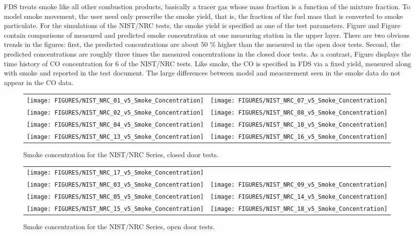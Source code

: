 FDS treats smoke like all other combustion products, basically a tracer gas whose mass fraction is a function of the mixture fraction.
To model smoke movement, the user need only prescribe the smoke yield, that is, the fraction of the fuel mass that is
converted to smoke particulate.  For the simulations of the NIST/NRC tests, the smoke yield is specified as one of the test parameters.
Figure and Figure contain comparisons of measured and predicted smoke concentration at one measuring station in the upper layer.
There are two obvious trends in the figures: first, the predicted concentrations are about 50 \% higher than the measured
in the open door tests.  Second,
the predicted concentrations are roughly three times the measured concentrations in the closed door tests.
As a contrast, Figure displays the time history of CO concentration for 6 of the NIST/NRC tests.
Like smoke, the CO is specified in FDS via a fixed yield, measured along with smoke and reported in the test document.
The large differences between model and measurement seen in the smoke data do not appear in the CO data.

\begin{figure}[p]
\begin{tabular*}{\textwidth}{l@{\extracolsep{\fill}}r}
\texttt{[image: FIGURES/NIST\_NRC\_01\_v5\_Smoke\_Concentration]} &
\texttt{[image: FIGURES/NIST\_NRC\_07\_v5\_Smoke\_Concentration]} \\
\texttt{[image: FIGURES/NIST\_NRC\_02\_v5\_Smoke\_Concentration]} &
\texttt{[image: FIGURES/NIST\_NRC\_08\_v5\_Smoke\_Concentration]} \\
\texttt{[image: FIGURES/NIST\_NRC\_04\_v5\_Smoke\_Concentration]} &
\texttt{[image: FIGURES/NIST\_NRC\_10\_v5\_Smoke\_Concentration]} \\
\texttt{[image: FIGURES/NIST\_NRC\_13\_v5\_Smoke\_Concentration]} &
\texttt{[image: FIGURES/NIST\_NRC\_16\_v5\_Smoke\_Concentration]}
\end{tabular*}
\caption{Smoke concentration for the NIST/NRC Series, closed door tests.}
\label{NIST_NRC_Smoke_Closed}
\end{figure}

\begin{figure}[p]
\begin{tabular*}{\textwidth}{l@{\extracolsep{\fill}}r}
\texttt{[image: FIGURES/NIST\_NRC\_17\_v5\_Smoke\_Concentration]} &
 \\
\texttt{[image: FIGURES/NIST\_NRC\_03\_v5\_Smoke\_Concentration]} &
\texttt{[image: FIGURES/NIST\_NRC\_09\_v5\_Smoke\_Concentration]} \\
\texttt{[image: FIGURES/NIST\_NRC\_05\_v5\_Smoke\_Concentration]} &
\texttt{[image: FIGURES/NIST\_NRC\_14\_v5\_Smoke\_Concentration]} \\
\texttt{[image: FIGURES/NIST\_NRC\_15\_v5\_Smoke\_Concentration]} &
\texttt{[image: FIGURES/NIST\_NRC\_18\_v5\_Smoke\_Concentration]}
\end{tabular*}
\caption{Smoke concentration for the NIST/NRC Series, open door tests.}
\label{NIST_NRC_Smoke_Open}
\end{figure}

\clearpage
